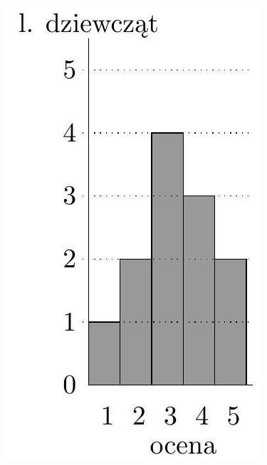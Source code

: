 \documentclass[10pt]{article}
\begin{document}
\includegraphics[max width=\textwidth, center]{2024_11_21_e9b4faa005d5be2cc318g-144}\\
\end{document}
